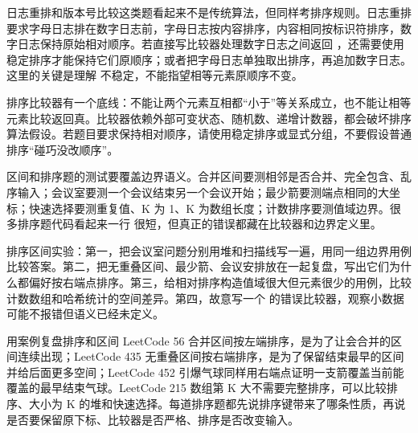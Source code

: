 日志重排和版本号比较这类题看起来不是传统算法，但同样考排序规则。日志重排要求字母日志排在数字日志前，字母日志按内容排序，内容相同按标识符排序，数字日志保持原始相对顺序。若直接写比较器处理数字日志之间返回 ，还需要使用稳定排序才能保持它们原顺序；或者把字母日志单独取出排序，再追加数字日志。这里的关键是理解  不稳定，不能指望相等元素原顺序不变。

\begin{warningbox}
排序比较器有一个底线：不能让两个元素互相都“小于”等关系成立，也不能让相等元素比较返回真。比较器依赖外部可变状态、随机数、递增计数器，都会破坏排序算法假设。若题目要求保持相对顺序，请使用稳定排序或显式分组，不要假设普通排序“碰巧没改顺序”。
\end{warningbox}

区间和排序题的测试要覆盖边界语义。合并区间要测相邻是否合并、完全包含、乱序输入；会议室要测一个会议结束另一个会议开始；最少箭要测端点相同的大坐标；快速选择要测重复值、K 为 1、K 为数组长度；计数排序要测值域边界。很多排序题代码看起来一行  很短，但真正的错误都藏在比较器和边界定义里。

\begin{labbox}
排序区间实验：第一，把会议室问题分别用堆和扫描线写一遍，用同一组边界用例比较答案。第二，把无重叠区间、最少箭、会议安排放在一起复盘，写出它们为什么都偏好按右端点排序。第三，给相对排序构造值域很大但元素很少的用例，比较计数数组和哈希统计的空间差异。第四，故意写一个  的错误比较器，观察小数据可能不报错但语义已经未定义。
\end{labbox}

\begin{principlebox}{用案例复盘排序和区间}
LeetCode 56 合并区间按左端排序，是为了让会合并的区间连续出现；LeetCode 435 无重叠区间按右端排序，是为了保留结束最早的区间并给后面更多空间；LeetCode 452 引爆气球同样用右端点证明一支箭覆盖当前能覆盖的最早结束气球。LeetCode 215 数组第 K 大不需要完整排序，可以比较排序、大小为 K 的堆和快速选择。每道排序题都先说排序键带来了哪条性质，再说是否要保留原下标、比较器是否严格、排序是否改变输入。
\end{principlebox}





